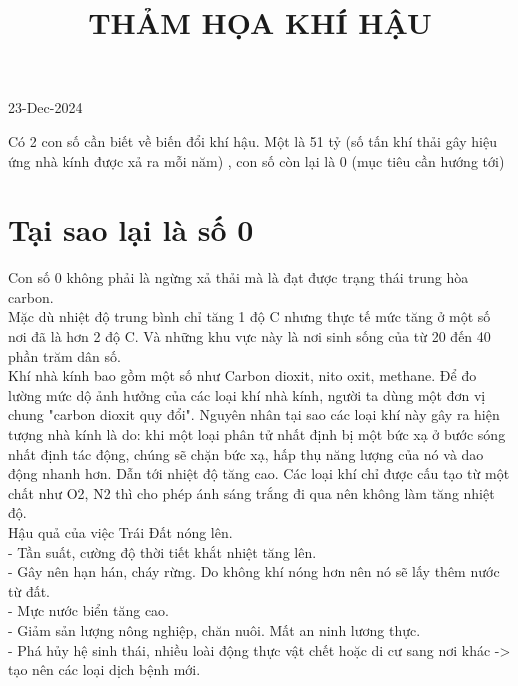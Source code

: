 \documentclass{article}
\title{THẢM HỌA KHÍ HẬU}
\newcommand\tab[1][1cm]{\hspace*{#1}}
\begin{document}
\maketitle

23-Dec-2024


Có 2 con số cần biết về biến đổi khí hậu. Một là 51 tỷ (số tấn khí thải gây hiệu ứng nhà kính được xả ra mỗi năm)
, con số còn lại là 0 (mục tiêu cần hướng tới)\\

\section{Tại sao lại là số 0}

\tab Con số 0 không phải là ngừng xả thải mà là đạt được trạng thái trung hòa carbon.\\
\tab Mặc dù nhiệt độ trung bình chỉ tăng 1 độ C nhưng thực tế mức tăng ở một số nơi đã là hơn 2 độ C. Và những 
khu vực này là nơi sinh sống của từ 20 đến 40 phần trăm dân số.\\
\tab Khí nhà kính bao gồm một số như Carbon dioxit, nito oxit, methane. Để đo lường mức dộ ảnh hưởng của các loại 
khí nhà kính, người ta dùng một đơn vị chung "carbon dioxit quy đổi". Nguyên nhân tại sao các loại khí này gây ra 
hiện tượng nhà kính là do: khi một loại phân tử nhất định bị một bức xạ ở bước sóng nhất định tác động, chúng sẽ chặn
bức xạ, hấp thụ năng lượng của nó và dao động nhanh hơn. Dẫn tới nhiệt độ tăng cao. Các loại khí chỉ được cấu tạo 
từ một chất như O2, N2 thì cho phép ánh sáng trắng đi qua nên không làm tăng nhiệt độ.\\
\tab Hậu quả của việc Trái Đất nóng lên.\\
\tab\tab - Tần suất, cường độ thời tiết khắt nhiệt tăng lên.\\
\tab\tab - Gây nên hạn hán, cháy rừng. Do không khí nóng hơn nên nó sẽ lấy thêm nước từ đất.\\
\tab\tab - Mực nước biển tăng cao.\\
\tab\tab - Giảm sản lượng nông nghiệp, chăn nuôi. Mất an ninh lương thực.\\
\tab\tab - Phá hủy hệ sinh thái, nhiều loài động thực vật chết hoặc di cư sang nơi khác -> tạo nên các loại dịch bệnh 
mới.\\
\end{document}
